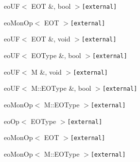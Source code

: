 \begin{CompactList}
\begin{CompactList}
\begin{CompactList}
\begin{CompactList}
\end{CompactList}
\end{CompactList}
\item eo\-UF$<$ EOT \&, bool $>${\tt  [external]}\begin{CompactList}
\item eo\-Mon\-Op$<$ EOT $>${\tt  [external]}\begin{CompactList}
\item {}
\end{CompactList}
\end{CompactList}
\item eo\-UF$<$ EOT \&, void $>${\tt  [external]}\begin{CompactList}
\item {}
\end{CompactList}
\item eo\-UF$<$ EOType \&, bool $>${\tt  [external]}\item eo\-UF$<$ M \&, void $>${\tt  [external]}\begin{CompactList}
\item {}
\end{CompactList}
\item eo\-UF$<$ M::EOType \&, bool $>${\tt  [external]}\begin{CompactList}
\item eo\-Mon\-Op$<$ M::EOType $>${\tt  [external]}\begin{CompactList}
\item {}
\begin{CompactList}
\item {}
\item {}
\item {}
\item {}
\end{CompactList}
\end{CompactList}
\end{CompactList}
\end{CompactList}
\item eo\-Op$<$ EOType $>${\tt  [external]}\begin{CompactList}
\item eo\-Mon\-Op$<$ EOT $>${\tt  [external]}\item eo\-Mon\-Op$<$ M::EOType $>${\tt  [external]}\end{CompactList}
\end{CompactList}
